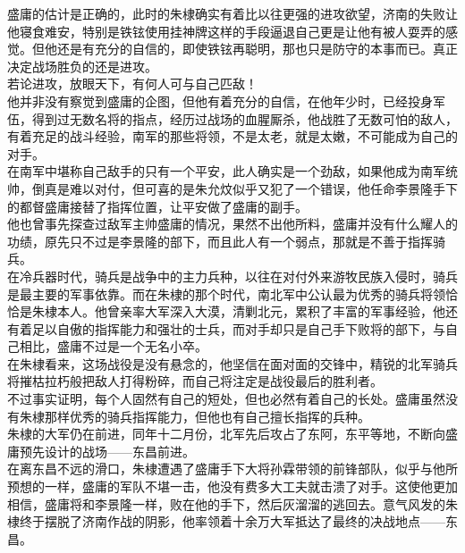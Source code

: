 \begin{multicols}{\theparacolNo}
盛庸的估计是正确的，此时的朱棣确实有着比以往更强的进攻欲望，济南的失败让他寝食难安，特别是铁铉使用挂神牌这样的手段逼退自己更是让他有被人耍弄的感觉。但他还是有充分的自信的，即使铁铉再聪明，那也只是防守的本事而已。真正决定战场胜负的还是进攻。\\

若论进攻，放眼天下，有何人可与自己匹敌！\\

他并非没有察觉到盛庸的企图，但他有着充分的自信，在他年少时，已经投身军伍，得到过无数名将的指点，经历过战场的血腥厮杀，他战胜了无数可怕的敌人，有着充足的战斗经验，南军的那些将领，不是太老，就是太嫩，不可能成为自己的对手。\\

在南军中堪称自己敌手的只有一个平安，此人确实是一个劲敌，如果他成为南军统帅，倒真是难以对付，但可喜的是朱允炆似乎又犯了一个错误，他任命李景隆手下的都督盛庸接替了指挥位置，让平安做了盛庸的副手。\\

他也曾事先探查过敌军主帅盛庸的情况，果然不出他所料，盛庸并没有什么耀人的功绩，原先只不过是李景隆的部下，而且此人有一个弱点，那就是不善于指挥骑兵。\\

在冷兵器时代，骑兵是战争中的主力兵种，以往在对付外来游牧民族入侵时，骑兵是最主要的军事依靠。而在朱棣的那个时代，南北军中公认最为优秀的骑兵将领恰恰是朱棣本人。他曾亲率大军深入大漠，清剿北元，累积了丰富的军事经验，他还有着足以自傲的指挥能力和强壮的士兵，而对手却只是自己手下败将的部下，与自己相比，盛庸不过是一个无名小卒。\\

在朱棣看来，这场战役是没有悬念的，他坚信在面对面的交锋中，精锐的北军骑兵将摧枯拉朽般把敌人打得粉碎，而自己将注定是战役最后的胜利者。\\

不过事实证明，每个人固然有自己的短处，但也必然有着自己的长处。盛庸虽然没有朱棣那样优秀的骑兵指挥能力，但他也有自己擅长指挥的兵种。\\

朱棣的大军仍在前进，同年十二月份，北军先后攻占了东阿，东平等地，不断向盛庸预先设计的战场——东昌前进。\\

在离东昌不远的滑口，朱棣遭遇了盛庸手下大将孙霖带领的前锋部队，似乎与他所预想的一样，盛庸的军队不堪一击，他没有费多大工夫就击溃了对手。这使他更加相信，盛庸将和李景隆一样，败在他的手下，然后灰溜溜的逃回去。意气风发的朱棣终于摆脱了济南作战的阴影，他率领着十余万大军抵达了最终的决战地点——东昌。\\


\end{multicols}
